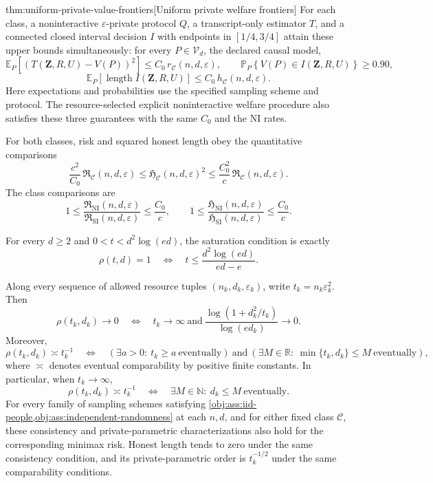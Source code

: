 \documentclass[11pt]{article}
\begin{document}
\begin{theoremv}{thm:uniform-private-value-frontiers}[Uniform private welfare frontiers]
For each class, a noninteractive \(\varepsilon\)-private protocol \(Q\), a transcript-only estimator \(T\), and a connected closed interval decision \(I\) with endpoints in \([1/4,3/4]\) attain these upper bounds simultaneously: for every \(P\in\mathcal V_d\), the declared causal model,
\[
\mathbb E_P\!\left[(T(\mathbf Z,R,U)-V(P))^2\right]
\le C_0\,r_{\mathcal C}(n,d,\varepsilon),
\qquad
\mathbb P_P\!\left\{V(P)\in I(\mathbf Z,R,U)\right\}\ge0.90,
\]
\[
\mathbb E_P\!\left[\operatorname{length}
 I(\mathbf Z,R,U)\right]
\le C_0\,h_{\mathcal C}(n,d,\varepsilon).
\]
Here expectations and probabilities use the specified sampling scheme and protocol. The resource-selected explicit noninteractive welfare procedure also satisfies these three guarantees with the same \(C_0\) and the NI rates.

For both classes, risk and squared honest length obey the quantitative comparisons
\[
\frac{c^2}{C_0}\,
\mathfrak R_{\mathcal C}(n,d,\varepsilon)
\le
\mathfrak H_{\mathcal C}(n,d,\varepsilon)^2
\le
\frac{C_0^2}{c}\,
\mathfrak R_{\mathcal C}(n,d,\varepsilon).
\]
The class comparisons are
\[
1\le
\frac{\mathfrak R_{\mathrm{NI}}(n,d,\varepsilon)}
     {\mathfrak R_{\mathrm{SI}}(n,d,\varepsilon)}
\le\frac{C_0}{c},
\qquad
1\le
\frac{\mathfrak H_{\mathrm{NI}}(n,d,\varepsilon)}
     {\mathfrak H_{\mathrm{SI}}(n,d,\varepsilon)}
\le\frac{C_0}{c}.
\]

For every \(d\ge2\) and \(0<t<d^2\log(ed)\), the saturation condition is exactly
\[
\rho(t,d)=1
\quad\Longleftrightarrow\quad
t\le\frac{d^2\log(ed)}{ed-e}.
\]

Along every sequence of allowed resource tuples
\((n_k,d_k,\varepsilon_k)\), write \(t_k=n_k\varepsilon_k^2\). Then
\[
\rho(t_k,d_k)\longrightarrow0
\quad\Longleftrightarrow\quad
t_k\longrightarrow\infty
\ \text{and}\
\frac{\log(1+d_k^2/t_k)}{\log(ed_k)}\longrightarrow0.
\]
Moreover,
\[
\rho(t_k,d_k)\asymp t_k^{-1}
\quad\Longleftrightarrow\quad
\left(\exists a>0:\ t_k\ge a\ \text{eventually}\right)
\ \text{and}\
\left(\exists M\in\mathbb R:\ \min\{t_k,d_k\}\le M\
\text{eventually}\right),
\]
where \(\asymp\) denotes eventual comparability by positive finite constants. In particular, when \(t_k\to\infty\),
\[
\rho(t_k,d_k)\asymp t_k^{-1}
\quad\Longleftrightarrow\quad
\exists M\in\mathbb N:\ d_k\le M\ \text{eventually}.
\]
For every family of sampling schemes satisfying
\cref{obj:ass:iid-people,obj:ass:independent-randomness} at each \(n,d\), and for either fixed class \(\mathcal C\), these consistency and private-parametric characterizations also hold for the corresponding minimax risk. Honest length tends to zero under the same consistency condition, and its private-parametric order is \(t_k^{-1/2}\) under the same comparability conditions.


\end{theoremv}
\end{document}
